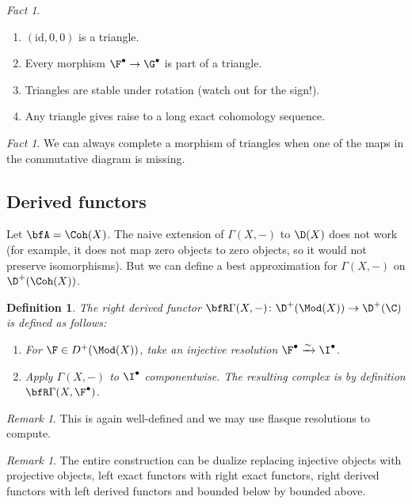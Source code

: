 \documentclass[A4paper, british]{amsart}
\theoremstyle{darkgreentheorem}
\theoremstyle{darkbluedefinition}
\newtheorem{defn}[thm]{Definition}
\theoremstyle{darkredexample}
\theoremstyle{remark}
\newtheorem{rem}[thm]{Remark}
\newtheorem{fact}[thm]{Fact}
\newcommand{\1}{\mathbbm{1}}
\newcommand{\id}{\mathrm{id}}
\newcommand{\grd}{^{\bullet}}
\begin{document}
\begin{fact}
    \begin{enumerate}
	\item $(\id,0,0)$ is a triangle.
	\item Every morphism $\F\grd\to \G\grd$ is part of a triangle.
	\item Triangles are stable under rotation (watch out for the sign!).
	\item Any triangle gives raise to a long exact cohomology sequence.
    \end{enumerate}
\end{fact}

\begin{fact}
    We can always complete a morphism of triangles when one of the maps in the commutative diagram is missing.
\end{fact}

\subsection{Derived functors}

Let $\bfA=\Coh(X)$.
The naive extension of $\Gamma(X,-)$ to $\D(X)$ does not work (for example, it does not map zero objects to zero objects, so it would not preserve isomorphisms).
But we can define a best approximation for $\Gamma(X,-)$ on $\D^{+}(\Coh(X))$.

\begin{defn}
    The \textit{right derived functor} $\bfR\Gamma(X,-)\colon \D^{+}(\Mod(X))\to \D^{+}(\C)$ is defined as follows:
    \begin{enumerate}
	\item For $\F\in D^{+}(\Mod(X))$, take an injective resolution $\F\grd\xrightarrow{\sim}\I\grd$.
	\item Apply $\Gamma(X,-)$ to $\I\grd$ componentwise.
	    The resulting complex is by definition $\bfR\Gamma(X,\F\grd)$.
    \end{enumerate}
\end{defn}

\begin{rem}
    This is again well-defined and we may use flasque resolutions to compute.
\end{rem}

\begin{rem}
    The entire construction can be dualize replacing injective objects with projective objects, left exact functors with right exact functors, right derived functors with left derived functors and bounded below by bounded above.
\end{rem}
\end{document}
